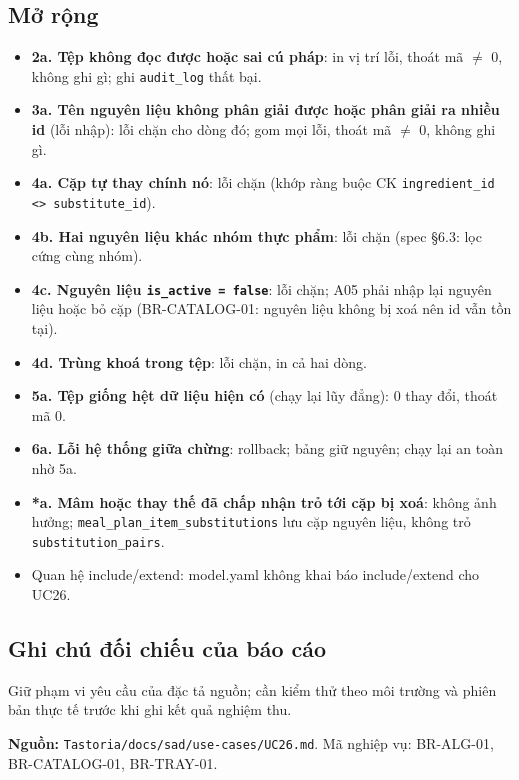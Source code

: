 \subsection{Mở rộng}
\begin{itemize}
\item \textbf{2a. Tệp không đọc được hoặc sai cú pháp}: in vị trí lỗi, thoát mã \ensuremath{\neq} 0, không ghi gì; ghi {\small\texttt{audit\_\allowbreak{}\allowbreak{}log}} thất bại.
\item \textbf{3a. Tên nguyên liệu không phân giải được hoặc phân giải ra nhiều id} (lỗi nhập): lỗi chặn cho dòng đó; gom mọi lỗi, thoát mã \ensuremath{\neq} 0, không ghi gì.
\item \textbf{4a. Cặp tự thay chính nó}: lỗi chặn (khớp ràng buộc CK {\small\texttt{ingredient\_\allowbreak{}\allowbreak{}id <> substitute\_\allowbreak{}\allowbreak{}id}}).
\item \textbf{4b. Hai nguyên liệu khác nhóm thực phẩm}: lỗi chặn (spec \S{}6.3: lọc cứng cùng nhóm).
\item \textbf{4c. Nguyên liệu {\small\texttt{is\_\allowbreak{}\allowbreak{}active = false}}}: lỗi chặn; A05 phải nhập lại nguyên liệu hoặc bỏ cặp (BR-\allowbreak{}CATALOG-\allowbreak{}01: nguyên liệu không bị xoá nên id vẫn tồn tại).
\item \textbf{4d. Trùng khoá trong tệp}: lỗi chặn, in cả hai dòng.
\item \textbf{5a. Tệp giống hệt dữ liệu hiện có} (chạy lại lũy đẳng): 0 thay đổi, thoát mã 0.
\item \textbf{6a. Lỗi hệ thống giữa chừng}: rollback; bảng giữ nguyên; chạy lại an toàn nhờ 5a.
\item \textbf{*a. Mâm hoặc thay thế đã chấp nhận trỏ tới cặp bị xoá}: không ảnh hưởng; {\small\texttt{meal\_\allowbreak{}\allowbreak{}plan\_\allowbreak{}\allowbreak{}item\_\allowbreak{}\allowbreak{}substitutions}} lưu cặp nguyên liệu, không trỏ {\small\texttt{substitution\_\allowbreak{}\allowbreak{}pairs}}.
\item Quan hệ include/\allowbreak{}extend: model.yaml không khai báo include/\allowbreak{}extend cho UC26.
\end{itemize}
\subsection{Ghi chú đối chiếu của báo cáo}
Giữ phạm vi yêu cầu của đặc tả nguồn; cần kiểm thử theo môi trường và phiên bản thực tế trước khi ghi kết quả nghiệm thu.

\textbf{Nguồn:} {\small\texttt{Tastoria/\allowbreak{}\allowbreak{}docs/\allowbreak{}\allowbreak{}sad/\allowbreak{}\allowbreak{}use-\allowbreak{}cases/\allowbreak{}\allowbreak{}UC26.\allowbreak{}md}}. Mã nghiệp vụ: BR-\allowbreak{}ALG-\allowbreak{}01, BR-\allowbreak{}CATALOG-\allowbreak{}01, BR-\allowbreak{}TRAY-\allowbreak{}01.

